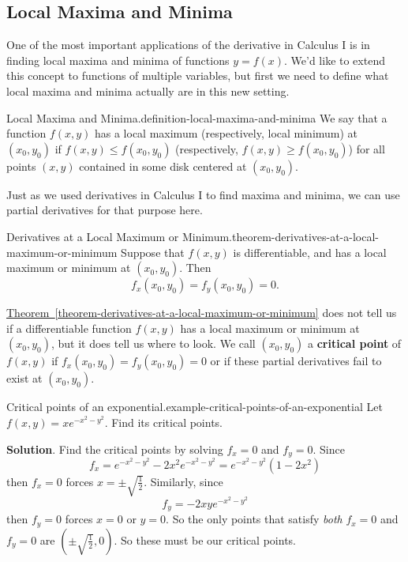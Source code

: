\documentclass[10pt,]{book}
\newcommand{\terminology}[1]{\textbf{#1}}
\numberwithin{equation}{section}
\begin{document}
\subsection[{Local Maxima and Minima}]{Local Maxima and Minima}\label{subsection-local-maxima-and-minima}
\hypertarget{p-1416}{}%
One of the most important applications of the derivative in Calculus I is in finding local maxima and minima of functions \(y = f(x)\). We'd like to extend this concept to functions of multiple variables, but first we need to define what local maxima and minima actually are in this new setting.%
\begin{definition}{Local Maxima and Minima.}{definition-local-maxima-and-minima}%
\hypertarget{p-1417}{}%
We say that a function \(f(x,y)\) has a local maximum (respectively, local minimum) at \((x_{0},y_{0})\) if \(f(x,y)\leq f(x_{0},y_{0})\) (respectively, \(f(x,y)\geq f(x_{0},y_{0})\)) for all points \((x,y)\) contained in some disk centered at \((x_{0},y_{0})\).%
\end{definition}
\hypertarget{p-1418}{}%
Just as we used derivatives in Calculus I to find maxima and minima, we can use partial derivatives for that purpose here.%
\begin{theorem}{Derivatives at a Local Maximum or Minimum.}{}{theorem-derivatives-at-a-local-maximum-or-minimum}%
\hypertarget{p-1419}{}%
Suppose that \(f(x,y)\) is differentiable, and has a local maximum or minimum at \((x_{0},y_{0})\). Then%
\begin{equation*}
f_{x}(x_{0},y_{0}) = f_{y}(x_{0},y_{0}) = 0.
\end{equation*}
%
\end{theorem}
\hypertarget{p-1420}{}%
\hyperref[theorem-derivatives-at-a-local-maximum-or-minimum]{Theorem~\ref{theorem-derivatives-at-a-local-maximum-or-minimum}} does not tell us if a differentiable function \(f(x,y)\) has a local maximum or minimum at \((x_{0},y_{0})\), but it does tell us where to look. We call \((x_{0},y_{0})\) a \terminology{critical point} of \(f(x,y)\) if \(f_{x}(x_{0},y_{0}) = f_{y}(x_{0},y_{0}) = 0\) or if these partial derivatives fail to exist at \((x_{0},y_{0})\).%
\begin{example}{Critical points of an exponential.}{example-critical-points-of-an-exponential}%
\hypertarget{p-1421}{}%
Let \(f(x,y) = xe^{-x^{2} - y^{2}}\). Find its critical points.%
\par\smallskip%
\noindent\textbf{Solution}.\hypertarget{solution-231}{}\quad%
\hypertarget{p-1422}{}%
Find the critical points by solving \(f_{x} = 0\) and \(f_{y} = 0\). Since%
\begin{equation*}
f_{x} = e^{-x^{2} - y^{2}} -2x^{2}e^{-x^{2} - y^{2}} = e^{-x^{2} - y^{2}}(1 - 2x^{2})
\end{equation*}
then \(f_{x} = 0\) forces \(x = \pm\sqrt{\frac{1}{2}}\). Similarly, since%
\begin{equation*}
f_{y} = -2xye^{-x^{2} - y^{2}}
\end{equation*}
then \(f_{y} = 0\) forces \(x = 0\) or \(y = 0\). So the only points that satisfy \emph{both} \(f_{x} = 0\) and \(f_{y} = 0\) are \((\pm\sqrt{\frac{1}{2}}, 0).\) So these must be our critical points.%
\end{example}
\end{document}

